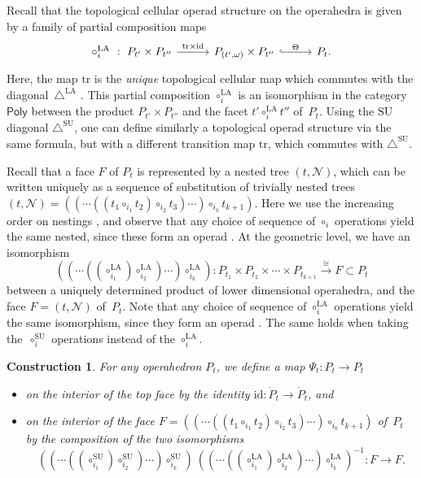 \documentclass{amsart}
\newtheorem{construction}[theorem]{Construction}
\theoremstyle{definition}
\newcommand{\SU}{\mathrm{SU}}
\newcommand{\LA}{\mathrm{LA}}
\newcommand{\SUD}{\triangle^{\mathrm{SU}}}
\newcommand{\LAD}{\triangle^{\mathrm{LA}}}
\newcommand{\PolySub}{\mathsf{Poly}}
\newcommand{\tr}{\mathrm{tr}}
\newcommand{\id}{\mathrm{id}}
\begin{document}
Recall that the topological cellular operad structure on the operahedra \cite[Def.~4.17]{LaplanteAnfossi} is given by a family of partial composition maps 
\[
\vcenter{\hbox{
\begin{tikzcd}[column sep=1cm]
\circ_i^{\LA}\ : \ P_{t'}\times P_{t''}
\arrow[r,  "\tr\times \id"]
& P_{(t',\omega)}\times P_{t''}
 \arrow[r,hookrightarrow, "\Theta"]
&
P_t .
\end{tikzcd}
}}  \]
Here, the map $\tr$ is the \emph{unique} topological cellular map which commutes with the diagonal~$\LAD$ \cite[Prop.~7]{MasudaThomasTonksVallette}. 
This partial composition $\circ_i^\LA$ is an isomorphism in the category $\PolySub$ \cite[Def.~4.13]{LaplanteAnfossi} between the product $P_{t'}\times P_{t''}$ and the facet $t' \circ_i^\LA t''$ of~$P_t$.
Using the $\SU$ diagonal $\SUD$, one can define similarly a topological operad structure via the same formula, but with a different transition map $\tr$, which commutes with $\SUD$.

Recall that a face $F$ of $P_t$ is represented by a nested tree $(t,\mathcal{N})$, which can be written uniquely as a sequence of substitution of trivially nested trees 
$(t,\mathcal{N})=((\cdots((t_1\circ_{i_1} t_2) \circ_{i_2} t_3) \cdots )\circ_{i_k} t_{k+1})$.
Here we use the increasing order on nestings \cite[Def. 4.5]{LaplanteAnfossi}, and observe that any choice of sequence of $\circ_i$ operations yield the same nested, since these form an operad \cite[Def.~4.7]{LaplanteAnfossi}.
At the geometric level, we have an isomorphism
\[((\cdots((\circ_{i_1}^\LA) \circ_{i_2}^\LA) \cdots) \circ_{i_k}^\LA): P_{t_1} \times P_{t_2} \times \cdots \times P_{t_{k+1}} \overset{\cong}{\longrightarrow} F \subset P_t \]
between a uniquely determined product of lower dimensional operahedra, and the face $F=(t,\mathcal{N})$ of~$P_t$.
Note that any choice of sequence of $\circ_i^\LA$ operations yield the same isomorphism, since they form an operad \cite[Thm.~4.18]{LaplanteAnfossi}.
The same holds when taking the~$\circ_i^\SU$ operations instead of the $\circ_i^\LA$. 

\begin{construction}
	\label{const:top-iso}
	For any operahedron $P_t$, we define a map $\Psi_t : P_t \to P_t$ 
	\begin{itemize}
		\item on the interior of the top face by the identity $\id : \mathring P_t \to \mathring P_t$, and 
		\item on the interior of the face $F=((\cdots((t_1 \circ_{i_1} t_2) \circ_{i_2} t_3) \cdots )\circ_{i_k} t_{k+1})$ of~$P_t$ by the composition of the two isomorphisms
		\[ 
		((\cdots ((\circ_{i_1}^\SU) \circ_{i_2}^\SU) \cdots) \circ_{i_k}^\SU) \ ((\cdots((\circ_{i_1}^\LA) \circ_{i_2}^\LA) \cdots) \circ_{i_k}^\LA)^{-1}: F \to F . \] 
	\end{itemize}
\end{construction}
\end{document}
